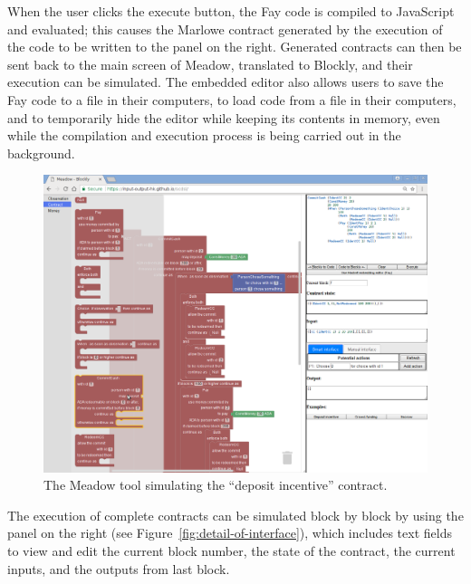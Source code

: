\documentclass[runningheads]{llncs}
\begin{document}
When the user clicks the execute button, the Fay code is 
compiled to JavaScript and evaluated; this causes the Marlowe contract generated by the execution of the code to be 
written to the panel on the right. Generated contracts can then be sent back to the main screen of Meadow, translated 
to Blockly, and their execution can be simulated. The embedded editor also allows users to save the Fay code to a 
file in their computers, to load code from a file in their computers, and to temporarily hide the editor while keeping 
its contents in memory, even while the compilation and execution process is being carried out in the background.

\begin{figure}[t]
\begin{centering}
\includegraphics[width=1.1\textwidth]{pix/screenshot1}
\par\end{centering}
\caption{\label{fig:full-screenshot-demo}The Meadow tool
simulating the ``deposit incentive'' contract.}
\vspace*{-6mm}
\end{figure}


The execution of complete contracts can be simulated block by block
by using the panel on the right (see Figure~\ref{fig:detail-of-interface}),
which includes text fields to view and edit the current block number,
the state of the contract, the current inputs, and the outputs from
last block.
\end{document}
